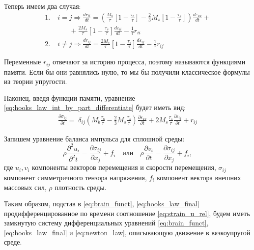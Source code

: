 \documentclass[a4paper, fontsize=14pt]{article}
\begin{document}
Теперь имеем два случая:
\begin{equation}
    \label{eq:brain_funct}
    \begin{aligned}
        1.& \; i = j \Rightarrow \frac{dr_{ii}}{dt} =    \left(\frac{M_b}{\tau} \left[1 - \frac{\tau_b}{\tau} \right] - \frac{2}{3} M_s \left[1 - \frac{\tau_s}{\tau}\right] \right) \frac{d \varepsilon_{kk}}{dt} + \\
        &\qquad +\frac{2 M_s}{\tau} \left[1 - \frac{\tau_s}{\tau} \right] \frac{d \varepsilon_{ii}}{dt} - \frac{1}{\tau} r_{ii} \\
        2.& \; i \neq j \Rightarrow \frac{dr_{ij}}{dt} = \frac{2 M_s}{\tau} \left[1 - \frac{\tau_s}{\tau} \right] \frac{d \varepsilon_{ij}}{dt} - \frac{1}{\tau} r_{ij} 
    \end{aligned}
\end{equation}

Переменные $r_{ij}$ отвечают за историю процесса, поэтому называются функциями памяти. Если бы они равнялись нулю, то мы бы получили классическое формулы из теории упругости.

Наконец, введя функции памяти, уравнение \eqref{eq:hooks_law_int_by_part_differentiate} будет иметь вид:
\begin{equation}
    \label{eq:hooks_law_final}
    \begin{aligned}
        \frac{\partial \sigma_{ij}}{\partial t}  = \; \delta_{ij} \left( M_b\frac{\tau_b}{\tau} - \frac{2}{3} M_s \frac{\tau_s}{\tau} \right)  \frac{\partial \varepsilon_{kk}}{\partial t} + 2 M_s \frac{\tau_s}{\tau} \frac{\partial \varepsilon_{ij}}{\partial t} + r_{ij}
    \end{aligned}
\end{equation}

Запишем уравнение баланса импульса для сплошной среды: 
\begin{equation}
    \label{eq:newton_law}
    \rho \frac{\partial^2 u_{i}}{\partial^2 t} = \frac{\partial \sigma_{ij}}{\partial x_j}  + f_{i} \quad \text{или} \quad \rho \frac{\partial v_{i}}{\partial t}  = \frac{\partial \sigma_{ij}}{\partial x_j}  + f_{i},
\end{equation}
где $u_{i}, v_{i}$ компоненты векторов перемещения и скорости перемещения, $\sigma_{ij}$ компонент симметричного тензора напряжения, $f_i$ компонент вектора внешних массовых сил, $\rho$ плотность среды.

Таким образом, подстав в \eqref{eq:brain_funct}, \eqref{eq:hooks_law_final} продифференцированное по времени соотношение \eqref{eq:strain_u_rel}, будем иметь замкнутую систему дифференциальных уравнений \eqref{eq:brain_funct}, \eqref{eq:hooks_law_final} и \eqref{eq:newton_law}, описывающую движение в вязкоупругой среде.
\end{document}
